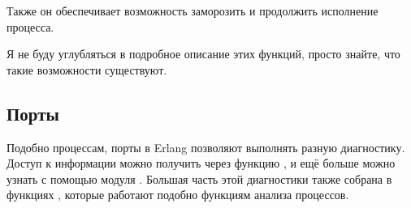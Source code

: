 \documentclass[11pt, oneside]{book}   	%
\begin{document}
Также он обеспечивает возможность заморозить и продолжить исполнение процесса.

Я не буду углубляться в подробное описание этих функций, просто знайте, что такие возможности существуют.


\subsection{Порты}

Подобно процессам, порты в Erlang позволяют выполнять разную диагностику. Доступ к информации можно получить через функцию , и ещё больше можно узнать с помощью модуля . Большая часть этой диагностики также собрана в функциях , которые работают подобно функциям анализа процессов.
\end{document}
